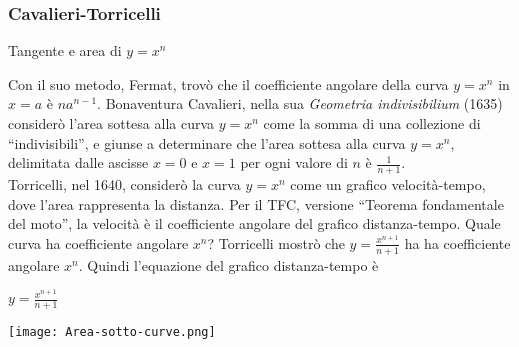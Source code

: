 \begin{frame}[label=Cavalieri-Torricelli]
    \frametitle{Cavalieri-Torricelli}
    \begin{block}{Tangente e area di $y = x^n$}

        Con il suo metodo, Fermat, trovò che il coefficiente angolare della curva $y = x^n$
        in $x=a$ è $na^{n-1}$. Bonaventura Cavalieri, nella sua \textit{Geometria indivisibilium} (1635)
        considerò l'area sottesa alla curva $y= x^n$ come la somma di una collezione di ``indivisibili'',
        e giunse a determinare che l'area sottesa alla curva $y= x^n$, delimitata dalle ascisse
        $x=0$ e $x=1$ per ogni valore di $n$ è $\frac{1}{n+1}$.\\
        Torricelli, nel 1640, considerò la curva $y = x^n$ come un grafico velocità-tempo,
        dove l'area rappresenta la distanza.
        Per il \alert{TFC}, versione ``Teorema fondamentale del moto'', la velocità è il 
        coefficiente angolare del grafico distanza-tempo. Quale curva ha coefficiente angolare
        $x^n$?  Torricelli mostrò che $y = \frac{x^{n+1}}{n+1}$ ha ha coefficiente angolare
        $x^n$. Quindi l'equazione del grafico distanza-tempo è 
        \begin{center}
            $y = \frac{x^{n+1}}{n+1}$
        \end{center}
        \begin{center}
        \texttt{[image: Area-sotto-curve.png]}
        \end{center}


    \end{block}
\end{frame}